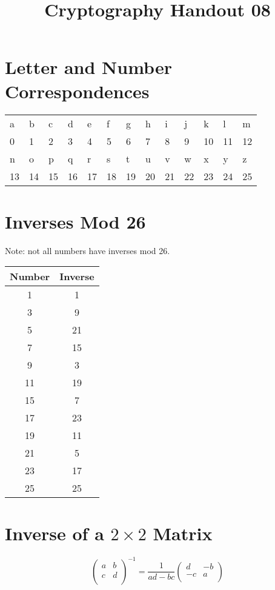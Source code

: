 \documentclass[12pt]{amsart}
\makeatletter
\def\subtitle#1{\gdef\@subtitle{#1}}
\def\@subtitle{}
\theoremstyle{plain}
\theoremstyle{definition}
\theoremstyle{remark}
\makeatother
\begin{document}
\onehalfspacing

\title[]{Cryptography Handout 08}
\subtitle{Escape Room Reference}
\maketitle

\section{Letter and Number Correspondences}
\begin{center}
\begin{tabular}{|p{.25in}|p{.25in}|p{.25in}|p{.25in}|p{.25in}|p{.25in}|p{.25in}|p{.25in}|p{.25in}|p{.25in}|p{.25in}|p{.25in}|p{.25in}|}\hline
a & b & c & d & e & f & g & h & i & j & k & l & m\\
0 & 1 & 2 & 3 & 4 & 5 & 6 & 7 & 8 & 9 & 10 & 11 & 12 \\ \hline
n & o & p & q & r & s & t & u & v & w & x & y & z\\
13 &14 & 15 & 16 & 17 & 18 & 19 & 20 & 21 & 22 & 23 & 24 & 25\\ \hline
\end{tabular}
\end{center}

\section{Inverses Mod 26}
Note: not all numbers have inverses mod 26.
\begin{center}
\begin{tabular}{|c|c|}\hline
Number & Inverse\\ \hline
1&1\\
3&9\\
5&21\\
7&15\\
9&3\\
11&19\\
15&7\\
17&23\\
19&11\\
21&5\\
23&17\\
25&25\\ \hline
\end{tabular}
\end{center}

\section{Inverse of a $2 \times 2$ Matrix}
$$\left(\begin{array}{rr}
a&b\\
c&d\\
\end{array}\right)^{-1} = \frac{1}{ad-bc} \left(\begin{array}{rr}
d&-b\\
-c&a\\
\end{array}\right)$$
\end{document}
